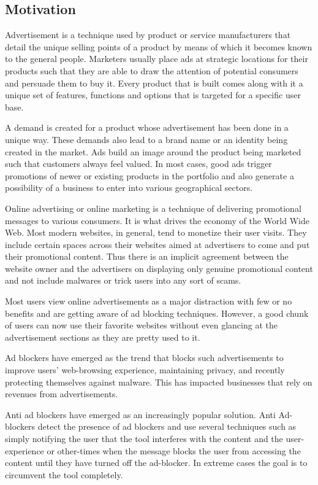 \documentclass[runningheads,a4paper]{llncs}
\begin{document}
\subsection{Motivation}
Advertisement is a technique used by product or service manufacturers that detail the unique selling points of a product by means of which it becomes known to the general people. Marketers usually place ads at strategic locations for their products such that they are able to draw the attention of potential consumers and persuade them to buy it. Every product that is built comes along with it a unique set of features, functions and options that is targeted for a specific user base.

A demand is created for a product whose advertisement has been done in a unique way. These demands also lead to a brand name or an identity being created in the market. Ads build an image around the product being marketed such that customers always feel valued. In most cases, good ads trigger promotions of newer or existing products in the portfolio and also generate a possibility of a business to enter into various geographical sectors.

Online advertising or online marketing is a technique of delivering promotional messages to various consumers. It is what drives the economy of the World Wide Web. Most modern websites, in general, tend to monetize their user visits. They include certain spaces across their websites aimed at advertisers to come and put their promotional content. Thus there is an implicit agreement between the website owner and the advertisers on displaying only genuine promotional content and not include malwares or trick users into any sort of scams.

Most users view online advertisements as a major distraction with few or no benefits and are getting aware of ad blocking techniques. However, a good chunk of users can now use their favorite websites without even glancing at the advertisement sections as they are pretty used to it.

Ad blockers have emerged as the trend that blocks such advertisements to improve users' web-browsing experience, maintaining privacy, and recently protecting themselves against malware. This has impacted businesses that rely on revenues from advertisements.

Anti ad blockers have emerged as an increasingly popular solution. Anti Ad-blockers detect the presence of ad blockers and use several techniques such as simply notifying the user that the tool interferes with the content and the user-experience or other-times when the message blocks the user from accessing the content until they have turned off the ad-blocker.\cite{Haris2015} In extreme cases the goal is to circumvent the tool completely.
\end{document}

